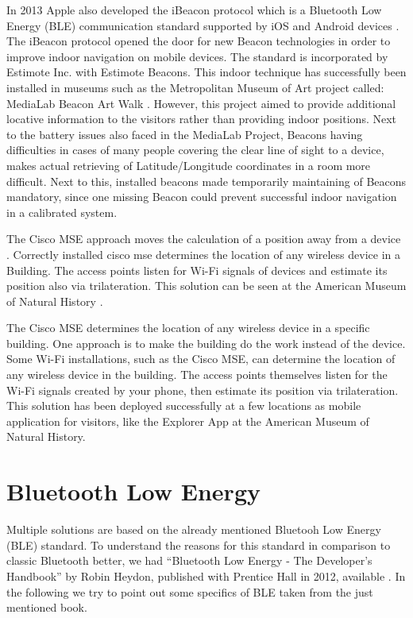 In 2013 Apple also developed the iBeacon protocol which is a Bluetooth Low Energy (BLE) communication standard supported by iOS and Android devices \cite{appleIBeacon}. The iBeacon protocol opened the door for new Beacon technologies in order to improve indoor navigation on mobile devices. The standard is incorporated by Estimote Inc. with Estimote Beacons. This indoor technique has successfully been installed in museums such as the Metropolitan Museum of Art project called: MediaLab Beacon Art Walk \cite{MuseumArt}. However, this project aimed to provide additional locative information to the visitors rather than providing indoor positions. Next to the battery issues also faced in the MediaLab Project, Beacons having difficulties  in cases of many people covering the clear line of sight to a device, makes actual retrieving of Latitude/Longitude coordinates in a room more difficult. Next to this, installed beacons made  temporarily maintaining of Beacons mandatory, since one missing Beacon could prevent successful indoor navigation in a calibrated system.

The Cisco MSE approach moves the calculation of a position away from a device \cite{oreilly11}. Correctly installed cisco mse determines the location of any wireless device in a Building. The access points listen for Wi-Fi signals of devices and estimate its position also via trilateration. This solution can be seen at the American Museum of Natural History \cite{AMNH15}.

The Cisco MSE determines the location of any wireless device in a specific building. One approach is to make the building do the work instead of the device. Some Wi-Fi installations, such as the Cisco MSE, can determine the location of any wireless device in the building. The access points themselves listen for the Wi-Fi signals created by your phone, then estimate its position via trilateration. This solution has been deployed successfully at a few locations as mobile application for visitors, like the Explorer App  at the American Museum of Natural History.


\vspace{0.5cm}

\section{Bluetooth Low Energy}

Multiple solutions are based on the already mentioned Bluetooh Low Energy (BLE) standard. To understand the reasons for this standard in comparison to classic Bluetooth better, we had \enquote{Bluetooth Low Energy - The Developer's Handbook} by Robin Heydon, published with Prentice Hall in 2012, available \cite{heydon2012bluetooth}. In the following we try to point out some specifics of BLE taken from the just mentioned book.

